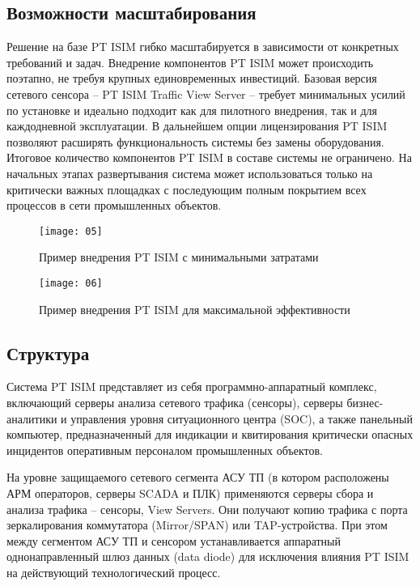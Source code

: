 \subsection{Возможности масштабирования}
Решение на базе PT ISIM гибко масштабируется в зависимости от конкретных требований и задач. Внедрение компонентов PT ISIM может происходить поэтапно, не требуя крупных единовременных инвестиций. Базовая версия сетевого сенсора -- PT ISIM Traffic View Server -- требует минимальных усилий по установке и идеально подходит как для пилотного внедрения, так и для каждодневной эксплуатации. В дальнейшем опции лицензирования PT ISIM позволяют расширять функциональность системы без замены оборудования. Итоговое количество компонентов PT ISIM в составе системы не ограничено. На начальных этапах развертывания система может использоваться только на критически важных площадках с последующим полным покрытием всех процессов в сети промышленных объектов.\par

\begin{figure}[h!]
    \centering
    \texttt{[image: 05]}
    \caption{Пример внедрения PT ISIM с минимальными затратами}
    \label{img:05}
\end{figure}

\clearpage

\begin{figure}[h!]
    \centering
    \texttt{[image: 06]}
    \caption{Пример внедрения PT ISIM для максимальной эффективности}
    \label{img:06}
\end{figure}

\subsection{Структура}
Система PT ISIM представляет из себя программно-аппаратный комплекс, включающий серверы анализа сетевого трафика (сенсоры), серверы бизнес-аналитики и управления уровня ситуационного центра (SOC), а также панельный компьютер, предназначенный для индикации и квитирования критически опасных инцидентов оперативным персоналом промышленных объектов.\par

На уровне защищаемого сетевого сегмента АСУ ТП (в котором расположены АРМ операторов, серверы SCADA и ПЛК) применяются серверы сбора и анализа трафика -- сенсоры, View Servers. Они получают копию трафика с порта зеркалирования коммутатора (Mirror/SPAN) или TAP-устройства. При этом между сегментом АСУ ТП и сенсором устанавливается аппаратный однонаправленный шлюз данных (data diode) для исключения влияния PT ISIM на действующий технологический процесс.\par

